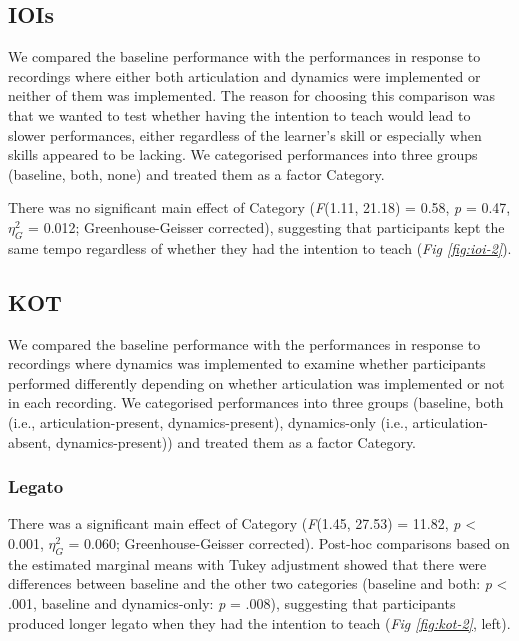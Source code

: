 \documentclass[
  man,floatsintext]{apa6}
\begin{document}
\hypertarget{iois-1}{%
\subsection{IOIs}\label{iois-1}}

We compared the baseline performance with the performances in response to recordings where either both articulation and dynamics were implemented or neither of them was implemented. The reason for choosing this comparison was that we wanted to test whether having the intention to teach would lead to slower performances, either regardless of the learner's skill or especially when skills appeared to be lacking. We categorised performances into three groups (baseline, both, none) and treated them as a factor Category.

There was no significant main effect of Category (\emph{F}(1.11, 21.18) = 0.58, \emph{p} = 0.47, \(\eta_G^2\) = 0.012; Greenhouse-Geisser corrected), suggesting that participants kept the same tempo regardless of whether they had the intention to teach (\emph{Fig \ref{fig:ioi-2}}).

\hypertarget{kot-1}{%
\subsection{KOT}\label{kot-1}}

We compared the baseline performance with the performances in response to recordings where dynamics was implemented to examine whether participants performed differently depending on whether articulation was implemented or not in each recording. We categorised performances into three groups (baseline, both (i.e., articulation-present, dynamics-present), dynamics-only (i.e., articulation-absent, dynamics-present)) and treated them as a factor Category.

\hypertarget{legato-1}{%
\subsubsection{Legato}\label{legato-1}}

There was a significant main effect of Category (\emph{F}(1.45, 27.53) = 11.82, \emph{p} \textless{} 0.001, \(\eta_G^2\) = 0.060; Greenhouse-Geisser corrected). Post-hoc comparisons based on the estimated marginal means with Tukey adjustment showed that there were differences between baseline and the other two categories (baseline and both: \emph{p} \textless{} .001, baseline and dynamics-only: \emph{p} = .008), suggesting that participants produced longer legato when they had the intention to teach (\emph{Fig \ref{fig:kot-2}}, left).
\end{document}

